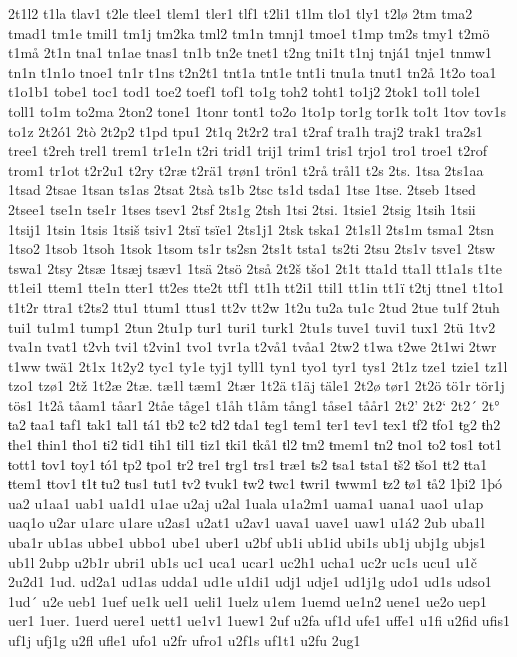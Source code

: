 2t1l2
t1la
tlav1
t2le
tlee1
tlem1
tler1
tlf1
t2li1
t1lm
tlo1
tly1
t2lø
2tm
tma2
tmad1
tm1e
tmil1
tm1j
tm2ka
tml2
tm1n
tmnj1
tmoe1
t1mp
tm2s
tmy1
t2mö
t1må
2t1n
tna1
tn1ae
tnas1
tn1b
tn2e
tnet1
t2ng
tni1t
t1nj
tnjá1
tnje1
tnmw1
tn1n
t1n1o
tnoe1
tn1r
t1ns
t2n2t1
tnt1a
tnt1e
tnt1i
tnu1a
tnut1
tn2å
1t2o
toa1
t1o1b1
tobe1
toc1
tod1
toe2
toef1
tof1
to1g
toh2
toht1
to1j2
2tok1
to1l
tole1
toll1
to1m
to2ma
2ton2
tone1
1tonr
tont1
to2o
1to1p
tor1g
tor1k
to1t
1tov
tov1s
to1z
2t2ó1
2tò
2t2p2
t1pd
tpu1
2t1q
2t2r2
tra1
t2raf
tra1h
traj2
trak1
tra2s1
tree1
t2reh
trel1
trem1
tr1e1n
t2ri
trid1
trij1
trim1
tris1
trjo1
tro1
troe1
t2rof
trom1
tr1ot
t2r2u1
t2ry
t2ræ
t2rä1
trøn1
trön1
t2rå
trål1
t2s
2ts.
1tsa
2ts1aa
1tsad
2tsae
1tsan
ts1as
2tsat
2tsà
ts1b
2tsc
ts1d
tsda1
1tse
1tse.
2tseb
1tsed
2tsee1
tse1n
tse1r
1tses
tsev1
2tsf
2ts1g
2tsh
1tsi
2tsi.
1tsie1
2tsig
1tsih
1tsii
1tsij1
1tsin
1tsis
1tsiš
tsiv1
2tsï
tsïe1
2ts1j1
2tsk
tska1
2t1s1l
2ts1m
tsma1
2tsn
1tso2
1tsob
1tsoh
1tsok
1tsom
ts1r
ts2sn
2ts1t
tsta1
ts2ti
2tsu
2ts1v
tsve1
2tsw
tswa1
2tsy
2tsæ
1tsæj
tsæv1
1tsä
2tsö
2tså
2t2š
tšo1
2t1t
tta1d
tta1l
tt1a1s
t1te
tt1ei1
ttem1
tte1n
tter1
tt2es
tte2t
ttf1
tt1h
tt2i1
ttil1
tt1in
tt1ï
t2tj
ttne1
t1to1
t1t2r
ttra1
t2ts2
ttu1
ttum1
ttus1
tt2v
tt2w
1t2u
tu2a
tu1c
2tud
2tue
tu1f
2tuh
tui1
tu1m1
tump1
2tun
2tu1p
tur1
turi1
turk1
2tu1s
tuve1
tuvi1
tux1
2tü
1tv2
tva1n
tvat1
t2vh
tvi1
t2vin1
tvo1
tvr1a
t2vå1
tvåa1
2tw2
t1wa
t2we
2t1wi
2twr
t1ww
twä1
2t1x
1t2y2
tyc1
ty1e
tyj1
tyll1
tyn1
tyo1
tyr1
tys1
2t1z
tze1
tzie1
tz1l
tzo1
tzø1
2tž
1t2æ
2tæ.
tæ1l
tæm1
2tær
1t2ä
t1äj
täle1
2t2ø
tør1
2t2ö
tö1r
tör1j
tös1
1t2å
tåam1
tåar1
2tåe
tåge1
t1åh
t1åm
tång1
tåse1
tåår1
2t2'
2t2`
2t2´
2t°
ŧa2
ŧaa1
ŧaf1
ŧak1
ŧal1
ŧá1
ŧb2
ŧc2
ŧd2
ŧda1
ŧeg1
ŧem1
ŧer1
ŧev1
ŧex1
ŧf2
ŧfo1
ŧg2
ŧh2
ŧhe1
ŧhin1
ŧho1
ŧi2
ŧid1
ŧih1
ŧil1
ŧiz1
ŧki1
ŧkå1
ŧl2
ŧm2
ŧmem1
ŧn2
ŧno1
ŧo2
ŧos1
ŧot1
ŧott1
ŧov1
ŧoy1
ŧó1
ŧp2
ŧpo1
ŧr2
ŧre1
ŧrg1
ŧrs1
ŧræ1
ŧs2
ŧsa1
ŧsta1
ŧš2
ŧšo1
ŧt2
ŧta1
ŧtem1
ŧtov1
ŧ1ŧ
ŧu2
ŧus1
ŧut1
ŧv2
ŧvuk1
ŧw2
ŧwc1
ŧwri1
ŧwwm1
ŧz2
ŧø1
ŧå2
1þi2
1þó
ua2
u1aa1
uab1
ua1d1
u1ae
u2aj
u2al
1uala
u1a2m1
uama1
uana1
uao1
u1ap
uaq1o
u2ar
u1arc
u1are
u2as1
u2at1
u2av1
uava1
uave1
uaw1
u1á2
2ub
uba1l
uba1r
ub1as
ubbe1
ubbo1
ube1
uber1
u2bf
ub1i
ub1id
ubi1s
ub1j
ubj1g
ubjs1
ub1l
2ubp
u2b1r
ubri1
ub1s
uc1
uca1
ucar1
uc2h1
ucha1
uc2r
uc1s
ucu1
u1č
2u2d1
1ud.
ud2a1
ud1as
udda1
ud1e
u1di1
udj1
udje1
ud1j1g
udo1
ud1s
udso1
1ud´
u2e
ueb1
1uef
ue1k
uel1
ueli1
1uelz
u1em
1uemd
ue1n2
uene1
ue2o
uep1
uer1
1uer.
1uerd
uere1
uett1
ue1v1
1uew1
2uf
u2fa
uf1d
ufe1
uffe1
u1fi
u2fid
ufis1
uf1j
ufj1g
u2fl
ufle1
ufo1
u2fr
ufro1
u2f1s
uf1t1
u2fu
2ug1
